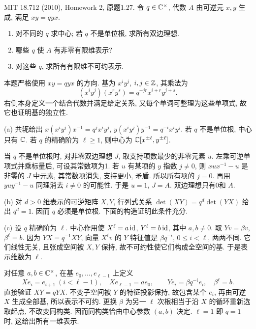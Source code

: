 \begin{exercise}\label{hw:1.27}
MIT 18.712 (2010), Homework 2, 原题1.27. 令 $q\in\mathbb C^\times$, 代数 $A$ 由可逆元 $x,y$ 生成, 满足 $xy=qyx$.
\begin{enumerate}[label=(\alph*)]
\item 对不同的 $q$ 求中心; 若 $q$ 不是单位根, 求所有双边理想.
\item 哪些 $q$ 使 $A$ 有非零有限维表示?
\item 对这些 $q$, 求所有有限维不可约表示.
\end{enumerate}
\end{exercise}
\begin{solution}
本题严格使用 $xy=qyx$ 的方向. 基为 $x^iy^j$, $i,j\in\mathbb Z$, 其乘法为
\[
(x^iy^j)(x^ry^s)=q^{-jr}x^{i+r}y^{j+s}.
\]
右侧本身定义一个结合代数并满足给定关系, 又每个单词可整理为这些单项式, 故它也证明基的独立性.

(a) 共轭给出 $x(x^iy^j)x^{-1}=q^j x^iy^j$, $y(x^iy^j)y^{-1}=q^{-i}x^iy^j$. 若 $q$ 不是单位根, 中心只有 $\mathbb C$. 若 $q$ 的精确阶为 $\ell\ge1$, 则中心为 $\mathbb C[x^{\pm\ell},y^{\pm\ell}]$.

当 $q$ 不是单位根时, 对非零双边理想 $J$, 取支持项数最少的非零元素 $u$. 左乘可逆单项式并乘标量后, 可设其常数项为1. 若 $u$ 有某项的 $y$ 指数 $j\ne0$, 则 $xux^{-1}-u$ 是非零的 $J$ 中元素, 其常数项消失, 支持更小, 矛盾. 所以所有项的 $j=0$. 再用 $yuy^{-1}-u$ 同理消去 $i\ne0$ 的可能性. 于是 $u=1$, $J=A$. 双边理想只有0和 $A$.

(b) 对 $d>0$ 维表示的可逆矩阵 $X,Y$, 行列式关系 $\det(XY)=q^d\det(YX)$ 给出 $q^d=1$. 因而 $q$ 必须是单位根. 下面的构造证明此条件充分.

(c) 设 $q$ 精确阶为 $\ell$. 中心作用使 $X^\ell=a\operatorname{id}$, $Y^\ell=b\operatorname{id}$, 其中 $a,b\ne0$. 取 $Yv=\beta v$, $\beta^\ell=b$. 因为 $YX=q^{-1}XY$, 向量 $X^iv$ 的 $Y$ 特征值是 $\beta q^{-i}$, $0\le i<\ell$, 两两不同. 它们线性无关, 且张成空间被 $X,Y$ 保持, 故不可约性使它们构成全空间的基. 于是表示维数为 $\ell$.

对任意 $a,b\in\mathbb C^\times$, 在基 $e_0,\ldots,e_{\ell-1}$ 上定义
\[
Xe_i=e_{i+1}\ (i<\ell-1),\quad Xe_{\ell-1}=ae_0,
\qquad Ye_i=\beta q^{-i}e_i,\quad \beta^\ell=b.
\]
直接验证 $XY=qYX$. 不变子空间被 $Y$ 的特征投影保持, 故包含某个 $e_i$, 再由可逆 $X$ 生成全部基, 所以表示不可约. 更换 $\beta$ 为另一 $\ell$ 次根相当于沿 $X$ 的循环重新选取起点, 不改变同构类. 因而同构类恰由中心参数 $(a,b)$ 决定. $\ell=1$ 即 $q=1$ 时, 这给出所有一维表示.
\end{solution}

